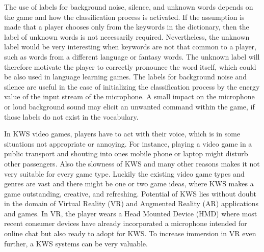 The use of labels for background noise, silence, and unknown words depends on the game and how the classification process is activated.
If the assumption is made that a player chooses only from the keywords in the dictionary, then the label of unknown words is not necessarily required.
Nevertheless, the unknown label would be very interesting when keywords are not that common to a player, such as words from a different language or fantasy words.
The unknown label will therefore motivate the player to correctly pronounce the word itself, which could be also used in language learning games.
The labels for background noise and silence are useful in the case of initializing the classification process by the energy value of the input stream of the microphone.
A small impact on the microphone or loud background sound may elicit an unwanted command within the game, if those labels do not exist in the vocabulary.

In KWS video games, players have to act with their voice, which is in some situations not appropriate or annoying.
For instance, playing a video game in a public transport and shouting into ones mobile phone or laptop might disturb other passengers.
Also the slowness of KWS and many other reasons makes it not very suitable for every game type.
Luckily the existing video game types and genres are vast and there might be one or two game ideas, where KWS makes a game outstanding, creative, and refreshing.
Potential of KWS lies without doubt in the domain of Virtual Reality (VR) and Augmented Reality (AR) applications and games.
In VR, the player wears a Head Mounted Device (HMD) where most recent consumer devices have already incorporated a microphone intended for online chat but also ready to adopt for KWS.
To increase immersion in VR even further, a KWS systems can be very valuable.